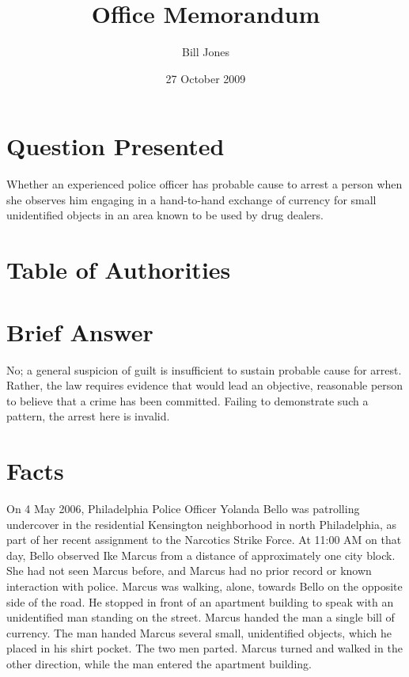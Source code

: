 \documentclass[12pt]{lawmemo}
\begin{document}
\title{Office Memorandum}
\author{Bill Jones}
\date{27 October 2009}
\subject{Pennsylvania v.\ Marcus}
\maketitle 
\thispagestyle{empty}


\section{Question Presented} Whether an experienced police officer has probable cause
to arrest a person when she observes him engaging in a hand-to-hand exchange of
currency for small unidentified objects in an area known to be used by drug
dealers.


\section{Table of Authorities}

\section{Brief Answer} No; a general suspicion of guilt is insufficient to
sustain probable cause for arrest.  Rather, the law requires evidence that
would lead an objective, reasonable person to believe that a crime has been
committed. Failing to demonstrate such a pattern, the arrest here is invalid.

\section{Facts}  On 4 May 2006, Philadelphia Police Officer
Yolanda Bello was patrolling undercover in the residential Kensington
neighborhood in north Philadelphia, as part of her recent assignment to the
Narcotics Strike Force. At 11:00 AM on that day, Bello observed Ike Marcus from
a distance of approximately one city block.  She had not seen Marcus before,
and Marcus had no prior record or known interaction with police.  Marcus was
walking, alone, towards Bello on the opposite side of the road.  He stopped in
front of an apartment building to speak with an unidentified man standing on
the street.  Marcus handed the man a single bill of currency.  The man handed
Marcus several small, unidentified objects, which he placed in his shirt
pocket.  The two men parted. Marcus turned and walked in the other direction,
while the man entered the apartment building.
\end{document}
